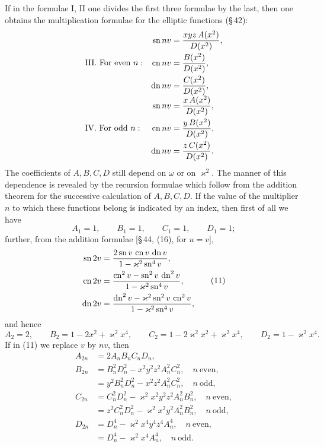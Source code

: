 \documentclass[11pt]{article}
\providecommand{\sn}{\operatorname{sn}}
\providecommand{\cn}{\operatorname{cn}}
\providecommand{\dn}{\operatorname{dn}}
\begin{document}
If in the formulae I, II one divides the first three formulae by the last, then one obtains
the multiplication formulae for the elliptic functions (\S\,42):
\[
\begin{array}{ll}
\text{III. For even }n:
&
\begin{aligned}
\sn nv&={xyz\,A(x^2)\over D(x^2)},\\
\cn nv&={B(x^2)\over D(x^2)},\\
\dn nv&={C(x^2)\over D(x^2)},
\end{aligned}
\\[2.0em]
\text{IV. For odd }n:
&
\begin{aligned}
\sn nv&={x\,A(x^2)\over D(x^2)},\\
\cn nv&={y\,B(x^2)\over D(x^2)},\\
\dn nv&={z\,C(x^2)\over D(x^2)}.
\end{aligned}
\end{array}
\]
The coefficients of $A,B,C,D$ still depend on $\omega$ or on $\varkappa^2$. The manner
of this dependence is revealed by the recursion formulae which follow from the addition
theorem for the successive calculation of $A,B,C,D$. If the value of the multiplier $n$ to
which these functions belong is indicated by an index, then first of all we have
\begin{equation}
A_1=1,\qquad B_1=1,\qquad C_1=1,\qquad D_1=1;
\tag{10}
\end{equation}
further, from the addition formulae [\S\,44, (16), for $u=v$],
\begin{equation}
\begin{aligned}
\sn 2v&={2\sn v\,\cn v\,\dn v\over 1-\varkappa^2\sn^4 v},\\
\cn 2v&={\cn^2 v-\sn^2 v\,\dn^2 v\over 1-\varkappa^2\sn^4 v},\\
\dn 2v&={\dn^2 v-\varkappa^2\sn^2 v\,\cn^2 v\over 1-\varkappa^2\sn^4 v},
\end{aligned}
\tag{11}
\end{equation}
and hence
\[
A_2=2,\qquad B_2=1-2x^2+\varkappa^2x^4,\qquad
C_2=1-2\varkappa^2x^2+\varkappa^2x^4,\qquad D_2=1-\varkappa^2x^4.
\tag{12}
\]
If in (11) we replace $v$ by $nv$, then
\begin{equation}
\begin{aligned}
A_{2n}&=2A_nB_nC_nD_n,\\
B_{2n}&=B_n^2D_n^2-x^2y^2z^2A_n^2C_n^2,\quad n\ \text{even},\\
&=y^2B_n^2D_n^2-x^2z^2A_n^2C_n^2,\quad n\ \text{odd},\\
C_{2n}&=C_n^2D_n^2-\varkappa^2x^2y^2z^2A_n^2B_n^2,\quad n\ \text{even},\\
&=z^2C_n^2D_n^2-\varkappa^2x^2y^2A_n^2B_n^2,\quad n\ \text{odd},\\
D_{2n}&=D_n^4-\varkappa^2x^4y^4z^4A_n^4,\quad n\ \text{even},\\
&=D_n^4-\varkappa^2x^4A_n^4,\quad n\ \text{odd}.
\end{aligned}
\tag{13}
\end{equation}
\end{document}

